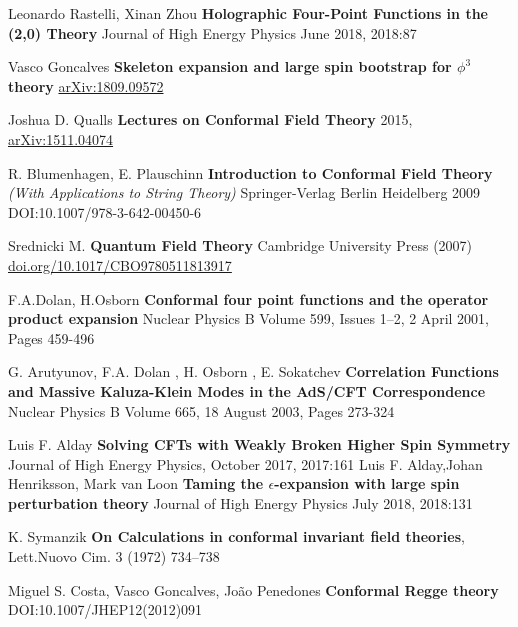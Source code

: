 \documentclass[12pt,a4paper,oneside]{book}
\theoremstyle{definition}
\begin{document}
\begin{thebibliography}{99}
                Leonardo Rastelli, Xinan Zhou
                \textbf{Holographic Four-Point Functions in the (2,0) Theory}
                Journal of High Energy Physics June 2018, 2018:87

                Vasco Goncalves
                \textbf{Skeleton expansion and large spin bootstrap for $\phi^3$ theory}
                \href{https://arxiv.org/abs/1809.09572}{arXiv:1809.09572}

                Joshua D. Qualls \textbf{Lectures on Conformal Field Theory} 2015, \href{https://arxiv.org/abs/1511.04074}{arXiv:1511.04074} 

                R. Blumenhagen, E. Plauschinn \textbf{Introduction to Conformal Field Theory} \textit{(With Applications to String Theory)} Springer-Verlag Berlin Heidelberg 2009 DOI:10.1007/978-3-642-00450-6

                Srednicki M. \textbf{Quantum Field Theory} 
                Cambridge University Press (2007)
                \href{https://doi.org/10.1017/CBO9780511813917
                }{doi.org/10.1017/CBO9780511813917
                }

                F.A.Dolan, H.Osborn
                \textbf{Conformal four point functions and the operator product expansion}
                Nuclear Physics B Volume 599, Issues 1–2, 2 April 2001, Pages 459-496

                G. Arutyunov, F.A. Dolan , H. Osborn , E. Sokatchev \textbf{Correlation Functions and Massive Kaluza-Klein Modes in the AdS/CFT Correspondence} Nuclear Physics B
                Volume 665, 18 August 2003, Pages 273-324

                Luis F. Alday
                \textbf{Solving CFTs with Weakly Broken Higher Spin Symmetry}
                Journal of High Energy Physics, October 2017, 2017:161
                Luis F. Alday,Johan Henriksson, Mark van Loon
                \textbf{Taming the $\epsilon$-expansion with large spin perturbation theory}
                Journal of High Energy Physics July 2018, 2018:131

                K. Symanzik
                \textbf{On Calculations in conformal invariant field theories}, Lett.Nuovo Cim. 3 (1972) 734–738

                 Miguel S. Costa, Vasco Goncalves, João Penedones 
                 \textbf{Conformal Regge theory} DOI:10.1007/JHEP12(2012)091
            \end{thebibliography}
    
\end{document}
